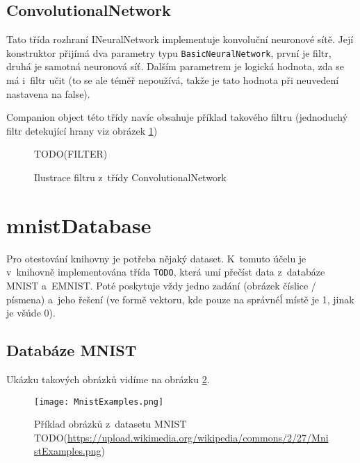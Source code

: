 \documentclass[12pt]{report}			%
\begin{document}
				\subsection{ConvolutionalNetwork}
					Tato třída rozhraní INeuralNetwork implementuje konvoluční neuronové sítě. Její konstruktor přijímá dva parametry typu \verb!BasicNeuralNetwork!, první je filtr, druhá je samotná neuronová síť. Dalším parametrem je logická hodnota, zda se má i~filtr učit (to se ale téměř nepoužívá, takže je tato hodnota při neuvedení nastavena na false).
					
					Companion object této třídy navíc obsahuje příklad takového filtru (jednoduchý filtr detekující hrany viz obrázek \ref{fig:filter})
					\begin{figure}
						TODO(FILTER)
						\caption{Ilustrace filtru z~třídy ConvolutionalNetwork}
						\label{fig:filter}
					\end{figure}
			
			\section{mnistDatabase}
				Pro otestování knihovny je potřeba nějaký dataset. K~tomuto účelu je v~knihovně implementována třída \verb!TODO!, která umí přečíst data z~databáze MNIST a~EMNIST. Poté poskytuje vždy jedno zadání (obrázek číslice / písmena) a~jeho řešení (ve formě vektoru, kde pouze na správnéĺ místě je 1, jinak je všúde 0).
				\subsection{Databáze MNIST}
					 \parencite[přeloženo]{online:MNIST} Ukázku takových obrázků vidíme na obrázku \ref{fig:MNIST}.
					
					\begin{figure}
						\texttt{[image: MnistExamples.png]}
						\caption{Příklad obrázků z~datasetu MNIST\\TODO(\url{https://upload.wikimedia.org/wikipedia/commons/2/27/MnistExamples.png})}
						\label{fig:MNIST}
					\end{figure}
					
\end{document}
